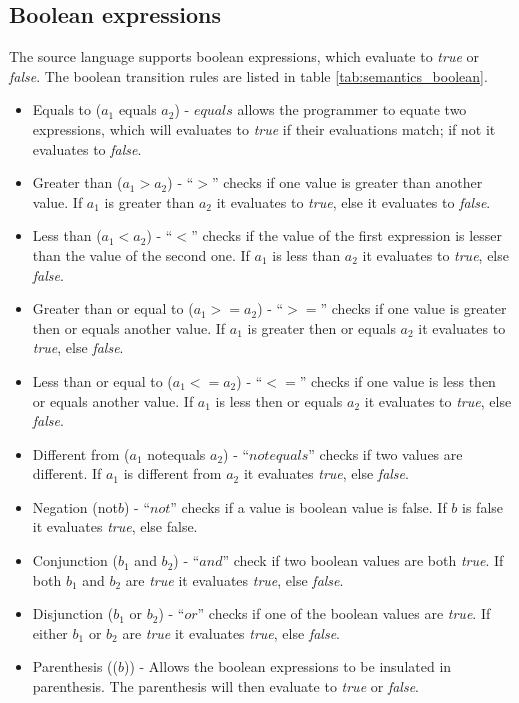 \subsection{Boolean expressions}
The source language supports boolean expressions, which evaluate to \textit{true} or \textit{false}. The boolean transition rules are listed in table \ref{tab:semantics_boolean}.
\begin{itemize}
	\item Equals to ($a_1$ equals $a_2$) - $equals$ allows the programmer to equate two expressions, which will evaluates to \textit{true} if their evaluations match; if not it evaluates to \textit{false}.
	\item Greater than ($a_1 > a_2$) - ``$>$'' checks if one value is greater than another value. If $a_1$ is greater than $a_2$ it evaluates to \textit{true}, else it evaluates to \textit{false}.
	\item Less than ($a_1 < a_2$) - ``$<$'' checks if the value of the first expression is lesser than the value of the second one. If $a_1$ is less than $a_2$ it evaluates to \textit{true}, else \textit{false}.
	\item Greater than or equal to ($a_1 >= a_2$) - ``$>=$'' checks if one value is greater then or equals another value. If $a_1$ is greater then or equals $a_2$ it evaluates to \textit{true}, else \textit{false}.
	\item Less than or equal to ($a_1 <= a_2$) - ``$<=$'' checks if one value is less then or equals another value. If $a_1$ is less then or equals $a_2$ it evaluates to \textit{true}, else \textit{false}.
	\item Different from ($a_1$ notequals $a_2$) - ``$notequals$'' checks if two values are different. If $a_1$ is different from $a_2$ it evaluates \textit{true}, else \textit{false}. 
	\item Negation (not$b$) - ``$not$'' checks if a value is boolean value is false. If $b$ is false it evaluates \textit{true}, else false.
	\item Conjunction ($b_1$ and $b_2$) - ``$and$'' check if two boolean values are both \textit{true}. If both $b_1$ and $b_2$ are \textit{true} it evaluates \textit{true}, else \textit{false}. 
	\item Disjunction ($b_1$ or $b_2$) - ``$or$'' checks if one of the boolean values are \textit{true}. If either $b_1$ or $b_2$ are \textit{true} it evaluates \textit{true}, else \textit{false}.
	\item Parenthesis (($b$)) - Allows the boolean expressions to be insulated in parenthesis. The parenthesis will then evaluate to \textit{true} or \textit{false}.
\end{itemize}
